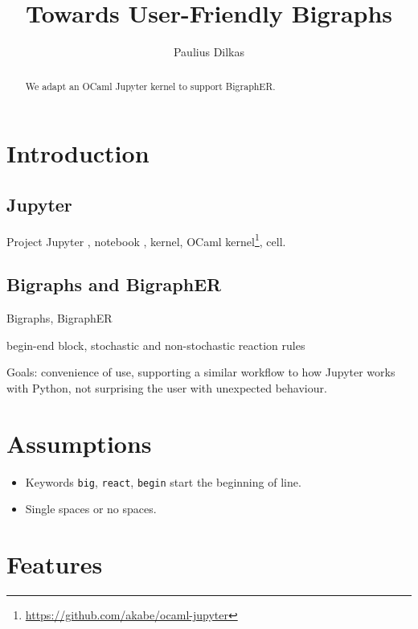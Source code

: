 \documentclass{article}
\author{Paulius Dilkas}
\title{Towards User-Friendly Bigraphs}
\begin{document}
\maketitle

\begin{abstract}
  We adapt an OCaml Jupyter kernel to support BigraphER.
\end{abstract}

\section{Introduction}

\subsection{Jupyter}

Project Jupyter \cite{website:jupyter}, notebook \cite{website:docs}, kernel,
OCaml kernel\footnote{\url{https://github.com/akabe/ocaml-jupyter}}, cell.

\subsection{Bigraphs and BigraphER}

Bigraphs, BigraphER \cite{Sevegnani2016}

begin-end block, stochastic and non-stochastic reaction rules

Goals: convenience of use, supporting a similar workflow to how Jupyter works
with Python, not surprising the user with unexpected behaviour.

\section{Assumptions}

\begin{itemize}
\item Keywords \texttt{big}, \texttt{react}, \texttt{begin} start the beginning
  of line.
\item Single spaces or no spaces.
\end{itemize}

\section{Features}
\end{document}
